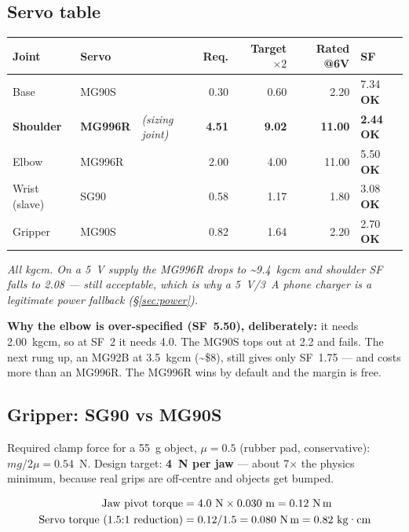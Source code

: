 \documentclass[11pt]{article}
\newcommand{\okmark}{\textcolor{armok}{\textbf{OK}}}
\begin{document}
\subsection{Servo table}
\begin{center}
\begin{tabular}{lllrrrl}
\toprule
\textbf{Joint} & \textbf{Servo} & & \textbf{Req.} & \textbf{Target $\times2$} & \textbf{Rated @6V} & \textbf{SF} \\
\midrule
Base & MG90S & & 0.30 & 0.60 & 2.20 & 7.34 \okmark \\
\textbf{Shoulder} & \textbf{MG996R} & \emph{(sizing joint)} & \textbf{4.51} & \textbf{9.02} & \textbf{11.00} & \textbf{2.44} \okmark \\
Elbow & MG996R & & 2.00 & 4.00 & 11.00 & 5.50 \okmark \\
Wrist (slave) & SG90 & & 0.58 & 1.17 & 1.80 & 3.08 \okmark \\
Gripper & MG90S & & 0.82 & 1.64 & 2.20 & 2.70 \okmark \\
\bottomrule
\end{tabular}
\end{center}
\emph{All kg\textperiodcentered cm. On a 5~V supply the MG996R drops to \textasciitilde9.4~kg\textperiodcentered cm and shoulder SF falls to 2.08 --- still acceptable, which is why a 5~V/3~A phone charger is a legitimate power fallback (\S\ref{sec:power}).}

\textbf{Why the elbow is over-specified (SF~5.50), deliberately:} it needs 2.00~kg\textperiodcentered cm, so at SF~2 it needs 4.0. The MG90S tops out at 2.2 and fails. The next rung up, an MG92B at 3.5~kg\textperiodcentered cm (\textasciitilde\$8), still gives only SF~1.75 --- and costs more than an MG996R. The MG996R wins by default and the margin is free.

\subsection{Gripper: SG90 vs MG90S}
Required clamp force for a 55~g object, $\mu=0.5$ (rubber pad, conservative): $mg/2\mu = 0.54$~N. Design target: \textbf{4~N per jaw} --- about 7$\times$ the physics minimum, because real grips are off-centre and objects get bumped.

\begin{align*}
\text{Jaw pivot torque} &= 4.0~\text{N} \times 0.030~\text{m} = 0.12~\text{N\,m} \\
\text{Servo torque (1.5:1 reduction)} &= 0.12 / 1.5 = 0.080~\text{N\,m} = 0.82~\text{kg\textperiodcentered cm}
\end{align*}
\end{document}
